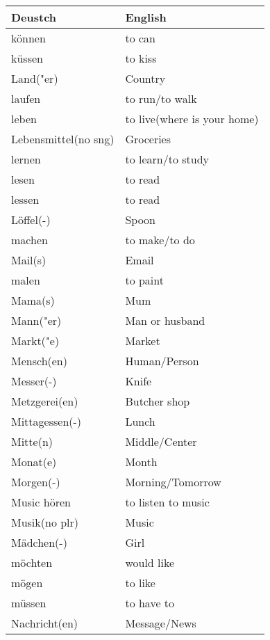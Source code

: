 \documentclass{article}
\renewcommand{\arraystretch}{1}
\begin{document}
\hfill
\begin{minipage}{0.48\textwidth}
    \centering
    \renewcommand{\arraystretch}{1.5}
    \begin{tabular}{|>{\raggedright\arraybackslash}p{3.5cm}|>{\raggedright\arraybackslash}p{3.5cm}|}
        \hline
        \rowcolor{gray!20} \textbf{Deustch} & \textbf{English} \\
        \hline
        können & to can \\\hline
        küssen & to kiss \\\hline
        Land("er) & Country \\\hline
        laufen & to run/to walk \\\hline
        leben & to live(where is your home) \\\hline
        Lebensmittel(no sng) & Groceries \\\hline
        lernen & to learn/to study \\\hline
        lesen & to read \\\hline
        lessen & to read \\\hline
        Löffel(-) & Spoon \\\hline
        machen & to make/to do \\\hline
        Mail(s) & Email \\\hline
        malen & to paint \\\hline
        Mama(s) & Mum \\\hline
        Mann("er) & Man or husband \\\hline
        Markt("e) & Market \\\hline
        Mensch(en) & Human/Person \\\hline
        Messer(-) & Knife \\\hline
        Metzgerei(en) & Butcher shop \\\hline
        Mittagessen(-) & Lunch \\\hline
        Mitte(n) & Middle/Center \\\hline
        Monat(e) & Month \\\hline
        Morgen(-) & Morning/Tomorrow \\\hline
        Music hören & to listen to music \\\hline
        Musik(no plr) & Music \\\hline
        Mädchen(-) & Girl \\\hline
        möchten & would like \\\hline
        mögen & to like \\\hline
        müssen & to have to \\\hline
        Nachricht(en) & Message/News \\\hline
    \end{tabular}
\end{minipage}
\end{document}
